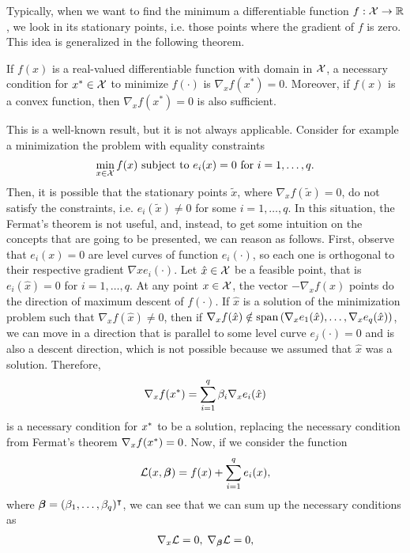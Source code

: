 Typically, when we want to find the minimum a differentiable function $f: \mathcal{X} \to \mathbb{R}$, we look in its stationary points, i.e. those points where the gradient of $f$ is zero. This idea is generalized in the following theorem.
\begin{theorem}
    If $f(x)$ is a real-valued differentiable function with domain in $\mathcal{X}$, a necessary condition for $x^* \in \mathcal{X}$ to minimize $f(\cdot)$ is $\nabla_x f(x^*) = 0$. Moreover, if $f(x)$ is a convex function, then $\nabla_x f(x^*) = 0$ is also sufficient.
\end{theorem}
This is a well-known result, but it is not always applicable. Consider for example a minimization the problem with equality constraints
$$ \min_{x \in \mathcal{X}} f(x) \text{ subject to } e_i(x)=0 \text{ for } i=1, \ldots, q .$$
Then, it is possible that the stationary points $\tilde{x}$, where $\nabla_x f(\tilde{x}) = 0$, do not satisfy the constraints, i.e. $e_i(\tilde{x}) \neq 0$ for some $i=1, \ldots, q$. In this situation, the Fermat's theorem is not useful, and, instead, to get some intuition on the concepts that are going to be presented, we can reason as follows. 
%
First, observe that $e_i(x)=0$ are level curves of function $e_i(\cdot)$, so each one is orthogonal to their respective gradient $\nabla x e_i(\cdot)$.  Let $\hat{x} \in \mathcal{X}$ be a feasible point, that is $e_i(\hat{x})=0$ for $i=1, \ldots, q$.
At any point $x \in \mathcal{X}$, the vector $-\nabla_x f(x)$ points do the direction of maximum descent of $f(\cdot)$.
If $\hat{x}$ is a solution of the minimization problem such that $\nabla_x f(\hat{x}) \neq 0$, then if $\nabla_x f(\hat{x}) \notin \operatorname{span}\left(\nabla_x e_1(\hat{x}), \ldots, \nabla_x e_q(\hat{x}) \right)$, we can move in a direction that is parallel to some level curve $e_j(\cdot)=0$ and is also a descent direction, which is not possible because we assumed that $\hat{x}$ was a solution.
Therefore,
\begin{equation}
    \label{eq:intuition_lagr}
    \nabla_x f(\opt{x}) = \sum_{i=1}^q \beta_i \nabla_x e_i(\hat{x})
\end{equation}
is a necessary condition for ${x}^*$ to be a solution, replacing the necessary condition from Fermat's theorem $\nabla_x f({x}^*) = 0$.
%
Now, if we consider the function $$\mathcal{L}(x, \bm{\beta}) = f(x) + \sum_{i=1}^q e_i(x),$$ where $\bm{\beta} = (\beta_1, \ldots, \beta_q)^\intercal$, we can see that we can sum up the necessary conditions as 
\begin{equation}\nonumber
    \begin{aligned}
        \nabla_x {\mathcal{L}}= 0, \; \nabla_{\bm{\beta}} {\mathcal{L}}= 0,
    \end{aligned}
\end{equation}

